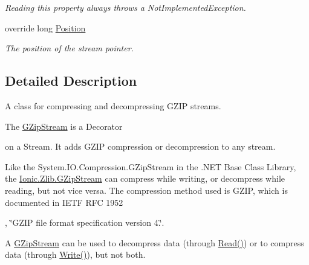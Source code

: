 \begin{DoxyCompactItemize}
\begin{DoxyCompactList}\small\item\em Reading this property always throws a Not\+Implemented\+Exception. \end{DoxyCompactList}\item 
override long \mbox{\hyperlink{class_super_tiled2_unity_1_1_ionic_1_1_zlib_1_1_g_zip_stream_adcdf8cb19b6e76db6966ea46af5316e9}{Position}}
\begin{DoxyCompactList}\small\item\em The position of the stream pointer. \end{DoxyCompactList}\end{DoxyCompactItemize}


\subsection{Detailed Description}
A class for compressing and decompressing G\+Z\+IP streams. 

The {\ttfamily \mbox{\hyperlink{class_super_tiled2_unity_1_1_ionic_1_1_zlib_1_1_g_zip_stream}{G\+Zip\+Stream}}} is a Decorator

on a Stream. It adds G\+Z\+IP compression or decompression to any stream. 

Like the {\ttfamily System.\+I\+O.\+Compression.\+G\+Zip\+Stream} in the .N\+ET Base Class Library, the {\ttfamily \mbox{\hyperlink{class_super_tiled2_unity_1_1_ionic_1_1_zlib_1_1_g_zip_stream}{Ionic.\+Zlib.\+G\+Zip\+Stream}}} can compress while writing, or decompress while reading, but not vice versa. The compression method used is G\+Z\+IP, which is documented in I\+E\+TF R\+FC 1952

, \char`\"{}\+G\+Z\+I\+P file format specification version 4.\char`\"{}.

A {\ttfamily \mbox{\hyperlink{class_super_tiled2_unity_1_1_ionic_1_1_zlib_1_1_g_zip_stream}{G\+Zip\+Stream}}} can be used to decompress data (through {\ttfamily \mbox{\hyperlink{class_super_tiled2_unity_1_1_ionic_1_1_zlib_1_1_g_zip_stream_a772b5013a585850ffaf8be4aa7f3dbcf}{Read()}}}) or to compress data (through {\ttfamily \mbox{\hyperlink{class_super_tiled2_unity_1_1_ionic_1_1_zlib_1_1_g_zip_stream_a49032afb5806563236a5d53841abe2b8}{Write()}}}), but not both. 

